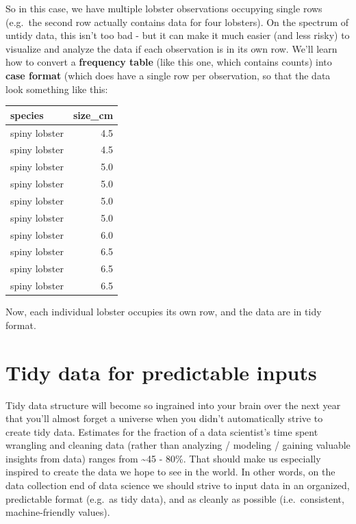 \documentclass[
]{book}
\begin{document}
So in this case, we have multiple lobster observations occupying single rows (e.g.~the second row actually contains data for four lobsters). On the spectrum of untidy data, this isn't too bad - but it can make it much easier (and less risky) to visualize and analyze the data if each observation is in its own row. We'll learn how to convert a \textbf{frequency table} (like this one, which contains counts) into \textbf{case format} (which does have a single row per observation, so that the data look something like this:

\begin{table}
\centering
\begin{tabular}{l|r}
\hline
species & size\_cm\\
\hline
spiny lobster & 4.5\\
\hline
spiny lobster & 4.5\\
\hline
spiny lobster & 5.0\\
\hline
spiny lobster & 5.0\\
\hline
spiny lobster & 5.0\\
\hline
spiny lobster & 5.0\\
\hline
spiny lobster & 6.0\\
\hline
spiny lobster & 6.5\\
\hline
spiny lobster & 6.5\\
\hline
spiny lobster & 6.5\\
\hline
\end{tabular}
\end{table}

Now, each individual lobster occupies its own row, and the data are in tidy format.

\hypertarget{tidy-data-for-predictable-inputs}{%
\section{Tidy data for predictable inputs}\label{tidy-data-for-predictable-inputs}}

Tidy data structure will become so ingrained into your brain over the next year that you'll almost forget a universe when you didn't automatically strive to create tidy data. Estimates for the fraction of a data scientist's time spent wrangling and cleaning data (rather than analyzing / modeling / gaining valuable insights from data) ranges from \textasciitilde45 - 80\%. That should make us especially inspired to create the data we hope to see in the world. In other words, on the data collection end of data science we should strive to input data in an organized, predictable format (e.g.~as tidy data), and as cleanly as possible (i.e.~consistent, machine-friendly values).\\
\end{document}

